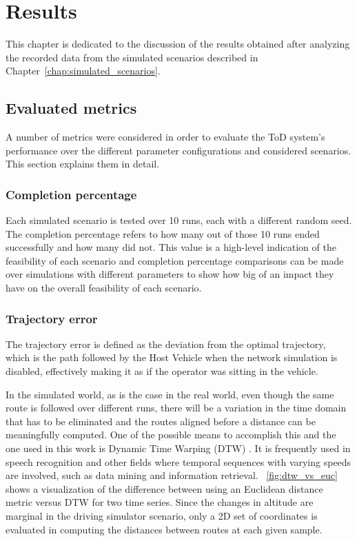 \chapter{Results}
\label{chap:results}
This chapter is dedicated to the discussion of the results obtained after analyzing the recorded data from the simulated scenarios described in Chapter~\ref{chap:simulated_scenarios}.


\section{Evaluated metrics}
A number of metrics were considered in order to evaluate the ToD system's performance over the different parameter configurations and considered scenarios. This section explains them in detail.

\subsection{Completion percentage}
Each simulated scenario is tested over 10 runs, each with a different random seed. The completion percentage refers to how many out of those 10 runs ended successfully and how many did not. This value is a high-level indication of the feasibility of each scenario and completion percentage comparisons can be made over simulations with different parameters to show how big of an impact they have on the overall feasibility of each scenario.

\subsection{Trajectory error}
The trajectory error is defined as the deviation from the optimal trajectory, which is the path followed by the Host Vehicle when the network simulation is disabled, effectively making it as if the operator was sitting in the vehicle.

In the simulated world, as is the case in the real world, even though the same route is followed over different runs, there will be a variation in the time domain that has to be eliminated and the routes aligned before a distance can be meaningfully computed. One of the possible means to accomplish this and the one used in this work is Dynamic Time Warping (DTW) \cite{traj_similarity_dtw_etc}. It is frequently used in speech recognition and other fields where temporal sequences with varying speeds are involved, such as data mining and information retrieval. \figurename~\ref{fig:dtw_vs_euc} shows a visualization of the difference between using an Euclidean distance metric versus DTW for two time series.
Since the changes in altitude are marginal in the driving simulator scenario, only a 2D set of coordinates is evaluated in computing the distances between routes at each given sample.

